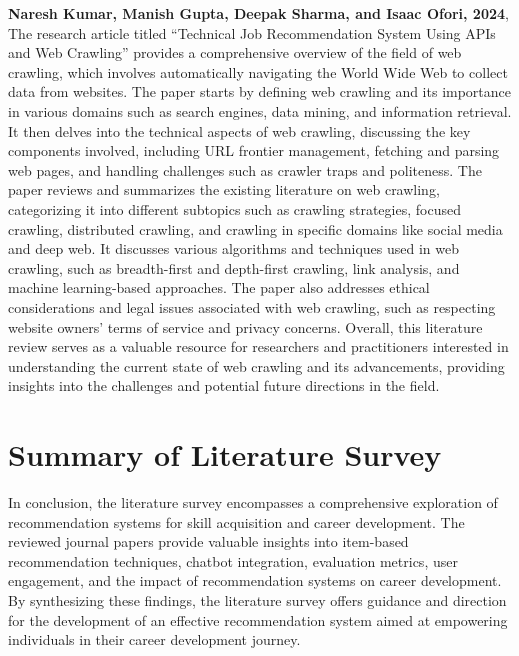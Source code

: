 \textbf{Naresh Kumar, Manish Gupta, Deepak Sharma, and Isaac Ofori, 2024}, The research article titled “Technical Job Recommendation System Using APIs and Web Crawling” provides a comprehensive overview of the field of web crawling, which involves automatically navigating the World Wide Web to collect data from websites. The paper starts by defining web crawling and its importance in various domains such as search engines, data mining, and information retrieval. It then delves into the technical aspects of web crawling, discussing the key components involved, including URL frontier management, fetching and parsing web pages, and handling challenges such as crawler traps and politeness. The paper reviews and summarizes the existing literature on web crawling, categorizing it into different subtopics such as crawling strategies, focused crawling, distributed crawling, and crawling in specific domains like social media and deep web. It discusses various algorithms and techniques used in web crawling, such as breadth-first and depth-first crawling, link analysis, and machine learning-based approaches. The paper also addresses ethical considerations and legal issues associated with web crawling, such as respecting website owners’ terms of service and privacy concerns. Overall, this literature review serves as a valuable resource for researchers and practitioners interested in understanding the current state of web crawling and its advancements, providing insights into the challenges and potential future directions in the field.


\section{Summary of Literature Survey}

In conclusion, the literature survey encompasses a comprehensive exploration of recommendation systems for skill acquisition and career development. The reviewed journal papers provide valuable insights into item-based recommendation techniques, chatbot integration, evaluation metrics, user engagement, and the impact of recommendation systems on career development. By synthesizing these findings, the literature survey offers guidance and direction for the development of an effective recommendation system aimed at empowering individuals in their career development journey.